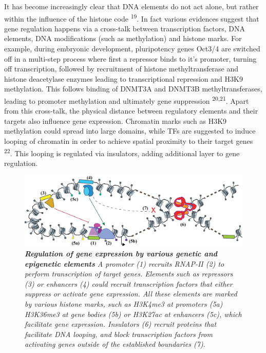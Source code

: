 \documentclass[11pt,twoside]{MPIthesis}
\theoremstyle{definition}
\theoremstyle{definition}
\theoremstyle{definition}
\theoremstyle{remark}
\begin{document}
It has become increasingly clear that DNA elements do not act alone, but
rather within the influence of the histone code \textsuperscript{19}. In
fact various evidences suggest that gene regulation happens via a
cross-talk between transcription factors, DNA elements, DNA
modifications (such as methylation) and histone marks. For example,
during embryonic development, pluripotency genes Oct3/4 are switched off
in a multi-step process where first a repressor binds to it's promoter,
turning off transcription, followed by recruitment of histone
methyltransferase and histone deacetylase enzymes leading to
transcriptional repression and H3K9 methylation. This follows binding of
DNMT3A and DNMT3B methyltransferases, leading to promoter methylation
and ultimately gene suppression \textsuperscript{20,21}. Apart from this
cross-talk, the physical distance between regulatory elements and their
targets also influence gene expression. Chromatin marks such as H3K9
methylation could spread into large domains, while TFs are suggested to
induce looping of chromatin in order to achieve spatial proximity to
their target genes \textsuperscript{22}. This looping is regulated via
insulators, adding additional layer to gene regulation.
\begin{figure}

{\centering \includegraphics[width=0.8\linewidth]{figures/intro_fig1} 

}

\caption[Regulation of gene expression by various genetic and epigenetic elements]{\emph{\textbf{Regulation of gene expression by various
genetic and epigenetic elements} A promoter (1) recruits RNAP-II (2) to
perform transcription of target genes. Elements such as repressors (3)
or enhancers (4) could recruit transcription factors that either
suppress or activate gene expression. All these elements are marked by
various histone marks, such as H3K4me3 at promoters (5a) H3K36me3 at
gene bodies (5b) or H3K27ac at enhancers (5c), which facilitate gene
expression. Insulators (6) recruit proteins that facilitate DNA looping,
and block transcription factors from activating genes outside of the
established boundaries (7).}}\label{fig:unnamed-chunk-1}
\end{figure}
\end{document}
